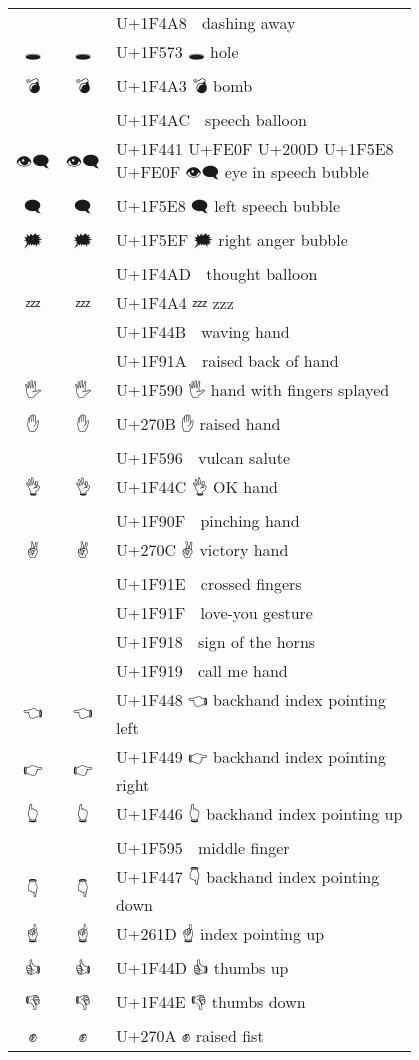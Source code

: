 \documentclass[a4paper,12pt]{ltjarticle}
\newcommand{\fontA}[1]{{\fontspec[RawFeature={mode=harf,+dist,+ccmp}]{Segoe UI Emoji} #1}}
\newcommand{\fontB}[1]{{\fontspec[RawFeature={mode=harf,+dist,+ccmp}]{Noto Color Emoji} #1}}
\begin{document}
\begin{longtable}[c]{ccp{0.8\linewidth}}
\fontA{💨}&\fontB{💨}&U+1F4A8 💨 dashing away\\
\fontA{🕳}&\fontB{🕳}&U+1F573 🕳 hole\\
\fontA{💣}&\fontB{💣}&U+1F4A3 💣 bomb\\
\fontA{💬}&\fontB{💬}&U+1F4AC 💬 speech balloon\\
\fontA{👁️‍🗨️}&\fontB{👁️‍🗨️}&U+1F441 U+FE0F U+200D U+1F5E8 U+FE0F 👁️‍🗨️ eye in speech bubble\\
\fontA{🗨}&\fontB{🗨}&U+1F5E8 🗨 left speech bubble\\
\fontA{🗯}&\fontB{🗯}&U+1F5EF 🗯 right anger bubble\\
\fontA{💭}&\fontB{💭}&U+1F4AD 💭 thought balloon\\
\fontA{💤}&\fontB{💤}&U+1F4A4 💤 zzz\\
\fontA{👋}&\fontB{👋}&U+1F44B 👋 waving hand\\
\fontA{🤚}&\fontB{🤚}&U+1F91A 🤚 raised back of hand\\
\fontA{🖐}&\fontB{🖐}&U+1F590 🖐 hand with fingers splayed\\
\fontA{✋}&\fontB{✋}&U+270B ✋ raised hand\\
\fontA{🖖}&\fontB{🖖}&U+1F596 🖖 vulcan salute\\
\fontA{👌}&\fontB{👌}&U+1F44C 👌 OK hand\\
\fontA{🤏}&\fontB{🤏}&U+1F90F 🤏 pinching hand\\
\fontA{✌}&\fontB{✌}&U+270C ✌ victory hand\\
\fontA{🤞}&\fontB{🤞}&U+1F91E 🤞 crossed fingers\\
\fontA{🤟}&\fontB{🤟}&U+1F91F 🤟 love-you gesture\\
\fontA{🤘}&\fontB{🤘}&U+1F918 🤘 sign of the horns\\
\fontA{🤙}&\fontB{🤙}&U+1F919 🤙 call me hand\\
\fontA{👈}&\fontB{👈}&U+1F448 👈 backhand index pointing left\\
\fontA{👉}&\fontB{👉}&U+1F449 👉 backhand index pointing right\\
\fontA{👆}&\fontB{👆}&U+1F446 👆 backhand index pointing up\\
\fontA{🖕}&\fontB{🖕}&U+1F595 🖕 middle finger\\
\fontA{👇}&\fontB{👇}&U+1F447 👇 backhand index pointing down\\
\fontA{☝}&\fontB{☝}&U+261D ☝ index pointing up\\
\fontA{👍}&\fontB{👍}&U+1F44D 👍 thumbs up\\
\fontA{👎}&\fontB{👎}&U+1F44E 👎 thumbs down\\
\fontA{✊}&\fontB{✊}&U+270A ✊ raised fist\\

\end{longtable}
\end{document}
